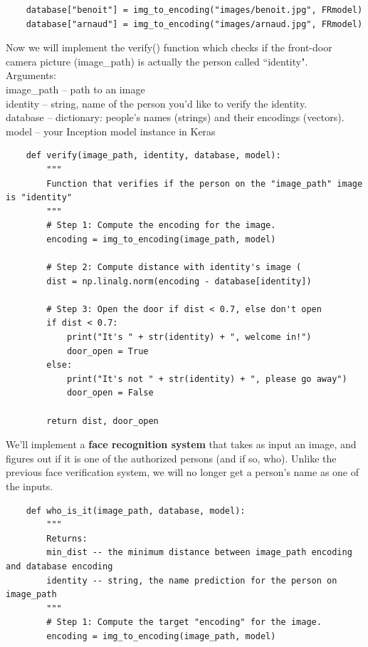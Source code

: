 \documentclass[11pt, a4paper]{article}
\begin{document}
\begin{spacing}{1.1}
\begin{lstlisting}
	database["benoit"] = img_to_encoding("images/benoit.jpg", FRmodel)
	database["arnaud"] = img_to_encoding("images/arnaud.jpg", FRmodel) \end{lstlisting} \vspace*{1mm}
	Now we will implement the verify() function which checks if the front-door camera picture (image\_path) is actually the person called ``identity". \vspace*{1mm}\\
	Arguments: \\
	\hspace*{3mm} image\_path -- path to an image\\
	\hspace*{3mm} identity -- string, name of the person you'd like to verify the identity.\\
	\hspace*{3mm} database -- dictionary: people's names (strings) and their encodings (vectors).\\
	\hspace*{3mm} model -- your Inception model instance in Keras \newpage

	\begin{lstlisting}
	def verify(image_path, identity, database, model):
		"""
		Function that verifies if the person on the "image_path" image is "identity"
		"""	
		# Step 1: Compute the encoding for the image. 
		encoding = img_to_encoding(image_path, model)
		
		# Step 2: Compute distance with identity's image (
		dist = np.linalg.norm(encoding - database[identity])
		
		# Step 3: Open the door if dist < 0.7, else don't open
		if dist < 0.7:
			print("It's " + str(identity) + ", welcome in!")
			door_open = True
		else:
			print("It's not " + str(identity) + ", please go away")
			door_open = False
		
		return dist, door_open \end{lstlisting} \vspace*{1mm}
	We'll implement a \textbf{face recognition system} that takes as input an image, and figures out if it is one of the authorized persons (and if so, who). Unlike the previous face verification system, we will no longer get a person's name as one of the inputs.
	\begin{lstlisting}
	def who_is_it(image_path, database, model):
		"""
		Returns:
		min_dist -- the minimum distance between image_path encoding and database encoding
		identity -- string, the name prediction for the person on image_path
		"""	
		# Step 1: Compute the target "encoding" for the image. 
		encoding = img_to_encoding(image_path, model)
		

\end{lstlisting}
\end{spacing}
\end{document}
